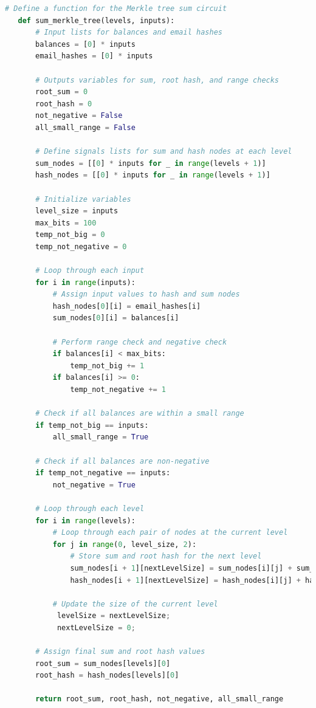 \begin{lstlisting}[language=Python, caption=Liabilities circuit pseudocode]
   # Define a function for the Merkle tree sum circuit
   def sum_merkle_tree(levels, inputs):
       # Input lists for balances and email hashes
       balances = [0] * inputs
       email_hashes = [0] * inputs
   
       # Outputs variables for sum, root hash, and range checks
       root_sum = 0
       root_hash = 0
       not_negative = False
       all_small_range = False
   
       # Define signals lists for sum and hash nodes at each level
       sum_nodes = [[0] * inputs for _ in range(levels + 1)]
       hash_nodes = [[0] * inputs for _ in range(levels + 1)]
   
       # Initialize variables
       level_size = inputs
       max_bits = 100
       temp_not_big = 0
       temp_not_negative = 0
   
       # Loop through each input
       for i in range(inputs):
           # Assign input values to hash and sum nodes
           hash_nodes[0][i] = email_hashes[i]
           sum_nodes[0][i] = balances[i]
   
           # Perform range check and negative check
           if balances[i] < max_bits:
               temp_not_big += 1
           if balances[i] >= 0:
               temp_not_negative += 1
   
       # Check if all balances are within a small range
       if temp_not_big == inputs:
           all_small_range = True
   
       # Check if all balances are non-negative
       if temp_not_negative == inputs:
           not_negative = True
   
       # Loop through each level
       for i in range(levels):
           # Loop through each pair of nodes at the current level
           for j in range(0, level_size, 2):
               # Store sum and root hash for the next level
               sum_nodes[i + 1][nextLevelSize] = sum_nodes[i][j] + sum_nodes[i][j+1]
               hash_nodes[i + 1][nextLevelSize] = hash_nodes[i][j] + hash_nodes[i][j+1]
   
           # Update the size of the current level
            levelSize = nextLevelSize;
            nextLevelSize = 0;
   
       # Assign final sum and root hash values
       root_sum = sum_nodes[levels][0]
       root_hash = hash_nodes[levels][0]
   
       return root_sum, root_hash, not_negative, all_small_range
   
\end{lstlisting}


